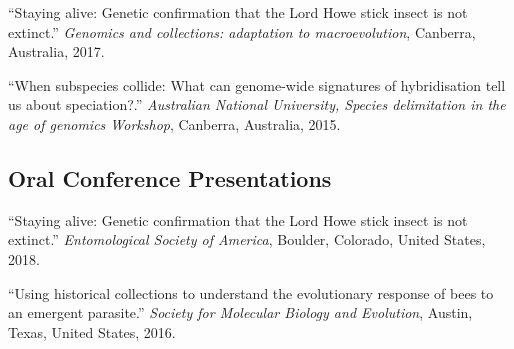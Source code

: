 \documentclass[11pt]{article}
\def\printdate#1{\xprintdate#1-}
\def\xprintdate#1-#2-#3-{#1}
\begin{document}
\ind ``Staying alive: Genetic confirmation that the Lord Howe stick
insect is not extinct.'' \emph{Genomics and collections: adaptation to
macroevolution}, Canberra, Australia, \printdate{2017-06-14}.












\ind ``When subspecies collide: What can genome-wide signatures of
hybridisation tell us about speciation?.'' \emph{Australian National
University, Species delimitation in the age of genomics
Workshop}, Canberra, Australia, \printdate{2015-00-00}.


























\subsection{Oral Conference Presentations}









\ind ``Staying alive: Genetic confirmation that the Lord Howe stick
insect is not extinct.'' \emph{Entomological Society of
America}, Boulder, Colorado, United States, \printdate{2018-00-00}.



\ind ``Using historical collections to understand the evolutionary
response of bees to an emergent parasite.'' \emph{Society for Molecular
Biology and Evolution}, Austin, Texas, United
States, \printdate{2016-00-00}.
\end{document}
